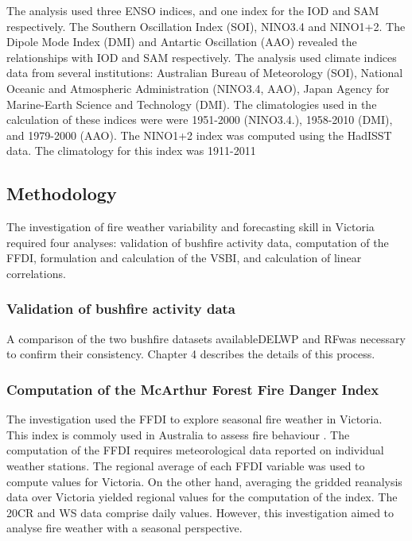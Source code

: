 The analysis used three ENSO indices, and one index for the IOD and
SAM respectively. The Southern Oscillation Index (SOI), NINO3.4 and
NINO1+2. The Dipole Mode Index (DMI) and Antartic Oscillation (AAO)
revealed the relationships with IOD and SAM respectively. The analysis
used climate indices data from several institutions: Australian Bureau
of Meteorology (SOI), National Oceanic and Atmospheric Administration
(NINO3.4, AAO), Japan Agency for Marine-Earth Science and Technology
(DMI). The climatologies used in the calculation of these indices
were were 1951-2000 (NINO3.4.), 1958-2010 (DMI), and 1979-2000 (AAO).
The NINO1+2 index was computed using the HadISST data. The climatology
for this index was 1911-2011 


\subsection{Methodology}

The investigation of fire weather variability and forecasting skill
in Victoria required four analyses: validation of bushfire activity
data, computation of the FFDI, formulation and calculation of the
VSBI, and calculation of linear correlations. 


\subsubsection{Validation of bushfire activity data}

A comparison of the two bushfire datasets available\textemdash DELWP
and RF\textemdash was necessary to confirm their consistency. Chapter
4 describes the details of this process.


\subsubsection{Computation of the McArthur Forest Fire Danger Index}

The investigation used the FFDI to explore seasonal fire weather in
Victoria. This index is commoly used in Australia to assess fire behaviour
\citep{Lucas2010}. The computation of the FFDI requires meteorological
data reported on individual weather stations. The regional average
of each FFDI variable was used to compute values for Victoria. On
the other hand, averaging the gridded reanalysis data over Victoria
yielded regional values for the computation of the index. The 20CR
and WS data comprise daily values. However, this investigation aimed
to analyse fire weather with a seasonal perspective. 


